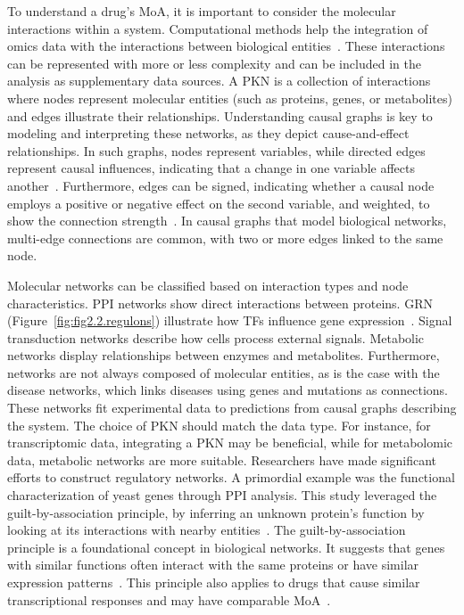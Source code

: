 To understand a drug's \gls{MoA}, it is important to consider the molecular interactions within a system. Computational methods help the integration of omics data with the interactions between biological entities~\cite{RN38}.
These interactions can be represented with more or less complexity and can be included in the analysis as supplementary data sources. 
A \gls{PKN} is a collection of interactions where nodes represent molecular entities (such as proteins, genes, or metabolites) and edges illustrate their relationships. 
Understanding causal graphs is key to modeling and interpreting these networks, as they depict cause-and-effect relationships. 
In such graphs, nodes represent variables, while directed edges represent causal influences, indicating that a change in one variable affects another~\cite{RN37}. 
Furthermore, edges can be signed, indicating whether a causal node employs a positive or negative effect on the second variable, and weighted, to show the connection strength~\cite{RN37}. 
In causal graphs that model biological networks, multi-edge connections are common, with two or more edges linked to the same node. 

\gls{Molecular network}s can be classified based on interaction types and node characteristics. \gls{PPI} networks show direct interactions between proteins. 
\gls{GRN} (Figure~\ref{fig:fig2.2.regulons}) illustrate how \gls{TF}s influence gene expression~\cite{RN145}. 
Signal transduction networks describe how cells process external signals. Metabolic networks display relationships between enzymes and metabolites. 
Furthermore, networks are not always composed of molecular entities, as is the case with the disease networks, which links diseases using genes and mutations as connections. 
These networks fit experimental data to predictions from causal graphs describing the system. The choice of \gls{PKN} should match the data type. 
For instance, for transcriptomic data, integrating a \gls{PKN} may be beneficial, while for metabolomic data, metabolic networks are more suitable. 
Researchers have made significant efforts to construct regulatory networks. A primordial example was the functional characterization of yeast genes through \gls{PPI} analysis. This study leveraged the guilt-by-association principle, by inferring an unknown protein's function by looking at its interactions with nearby entities~\cite{RN37, RN103}. 
The guilt-by-association principle is a foundational concept in biological networks. It suggests that genes with similar functions often interact with the same proteins or have similar expression patterns~\cite{RN133}. 
This principle also applies to drugs that cause similar transcriptional responses and may have comparable \gls{MoA}~\cite{RN64}.


